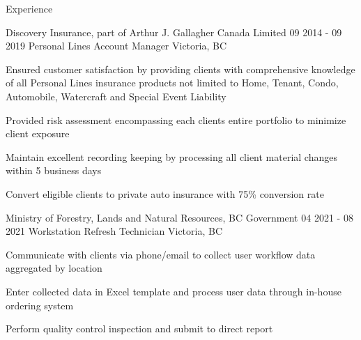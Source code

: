 \documentclass{resume}
\begin{document}
\begin{headersection}
    {Experience}
    
    \begin{itemsection}
        {Discovery Insurance, part of Arthur J. Gallagher Canada Limited}
        {09 2014 - 09 2019}
        {Personal Lines Account Manager}
        {Victoria, BC}

        \item Ensured customer satisfaction by providing clients with comprehensive knowledge of all Personal Lines insurance products not limited to Home, Tenant, Condo, Automobile, Watercraft and Special Event Liability
        \item Provided risk assessment encompassing each clients entire portfolio to minimize client exposure
        \item Maintain excellent recording keeping by processing all client material changes within 5 business days
        \item Convert eligible clients to private auto insurance with 75\% conversion rate
    \end{itemsection}
    \itemsectionskip
    \begin{itemsection}
        {Ministry of Forestry, Lands and Natural Resources, BC Government}
        {04 2021 - 08 2021}
        {Workstation Refresh Technician}
        {Victoria, BC}

        \item Communicate with clients via phone/email to collect user workflow data aggregated by location
        \item Enter collected data in Excel template and process user data through in-house ordering system
        \item Perform quality control inspection and submit to direct report
    \end{itemsection}
\end{headersection}
\end{document}

